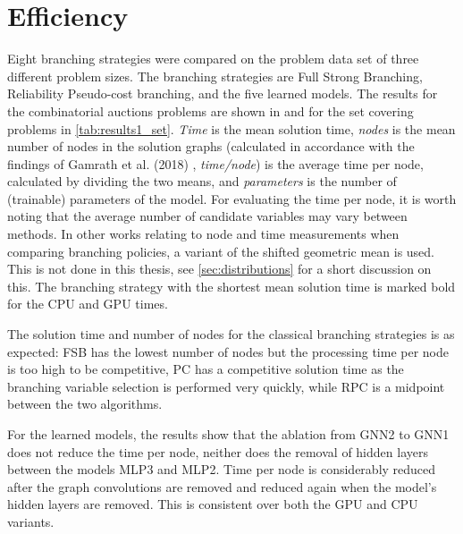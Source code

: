 


\section{Efficiency}\label{sec:res_efficiency}

Eight branching strategies were compared on the problem data set of three different problem sizes. The branching strategies are Full Strong Branching, Reliability Pseudo-cost branching, and the five learned models. The results for the combinatorial auctions problems are shown in  and for the set covering problems in \cref{tab:results1_set}. \textit{Time} is the mean solution time, \textit{nodes} is the mean number of nodes in the solution graphs (calculated in accordance with the findings of Gamrath et al. (2018) \cite{gamrath2018measuring}, \textit{time/node}) is the average time per node, calculated by dividing the two means, and \textit{parameters} is the number of (trainable) parameters of the model. For evaluating the time per node, it is worth noting that the average number of candidate variables may vary between methods. In other works relating to node and time measurements when comparing branching policies, a variant of the shifted geometric mean is used. This is not done in this thesis, see \cref{sec:distributions} for a short discussion on this. 
The branching strategy with the shortest mean solution time is marked bold for the \gls{CPU} and \gls{GPU} times. 

The solution time and number of nodes for the classical branching strategies is as expected: \gls{FSB} has the lowest number of nodes but the processing time per node is too high to be competitive, \gls{PC} has a competitive solution time as the branching variable selection is performed very quickly, while \gls{RPC} is a midpoint between the two algorithms. 

For the learned models, the results show that the ablation from GNN2 to GNN1 does not reduce the time per node, neither does the removal of hidden layers between the models MLP3 and MLP2. Time per node is considerably reduced after the graph convolutions are removed and reduced again when the model's hidden layers are removed. This is consistent over both the \gls{GPU} and \gls{CPU} variants.  



